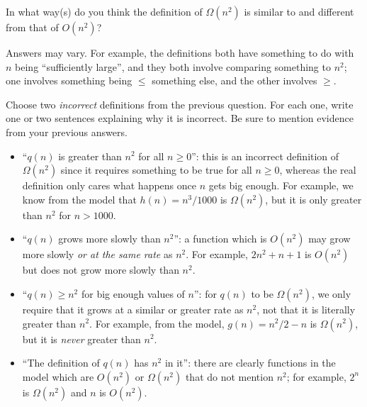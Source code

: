 \documentclass{tufte-handout}
\begin{document}
\begin{questions}
\newpage
\item \label{q:compare} In what way(s) do you think the definition of $\Omega(n^2)$ is similar to
  and different from that of $O(n^2)$?
  \begin{answer}
    Answers may vary.  For example, the definitions both have
    something to do with $n$ being ``sufficiently large'', and they
    both involve comparing something to $n^2$; one involves something
    being $\leq$ something else, and the other involves $\geq$.
  \end{answer}

\item \label{q:incorrect} Choose two \emph{incorrect} definitions from
  the previous question.  For each one, write one or two sentences
  explaining why it is incorrect.  Be sure to mention evidence from
  your previous answers.
  \begin{answer}
    \begin{itemize}
    \item ``$q(n)$ is greater than $n^2$ for all $n \geq 0$'': this is
      an incorrect definition of $\Omega(n^2)$ since it requires
      something to be true for all $n \geq 0$, whereas the real
      definition only cares what happens once $n$ gets big enough.
      For example, we know from the model that $h(n) = n^3/1000$ is
      $\Omega(n^2)$, but it is only greater than $n^2$ for $n > 1000$.
    \item ``$q(n)$ grows more slowly than $n^2$'': a function which is
      $O(n^2)$ may grow more slowly \emph{or at the same rate} as
      $n^2$.  For example, $2n^2 + n + 1$ is $O(n^2)$ but does not
      grow more slowly than $n^2$.
    \item ``$q(n) \geq n^2$ for big enough values of $n$'': for $q(n)$
      to be $\Omega(n^2)$, we only require that it grows at a similar
      or greater rate as $n^2$, not that it is literally greater than
      $n^2$.  For example, from the model, $g(n) = n^2/2 - n$ is
      $\Omega(n^2)$, but it is \emph{never} greater than $n^2$.
    \item ``The definition of $q(n)$ has $n^2$ in it'': there are
      clearly functions in the model which are $O(n^2)$ or
      $\Omega(n^2)$ that do not mention $n^2$; for example, $2^n$ is
      $\Omega(n^2)$ and $n$ is $O(n^2)$.
    \end{itemize}
  \end{answer}
\end{questions}

\pause
\end{document}
